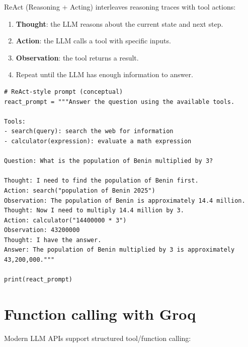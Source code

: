 ReAct (Reasoning + Acting) interleaves reasoning traces with tool actions:

\begin{enumerate}
  \item \textbf{Thought}: the LLM reasons about the current state and next step.
  \item \textbf{Action}: the LLM calls a tool with specific inputs.
  \item \textbf{Observation}: the tool returns a result.
  \item Repeat until the LLM has enough information to answer.
\end{enumerate}

\begin{verbatim}
# ReAct-style prompt (conceptual)
react_prompt = """Answer the question using the available tools.

Tools:
- search(query): search the web for information
- calculator(expression): evaluate a math expression

Question: What is the population of Benin multiplied by 3?

Thought: I need to find the population of Benin first.
Action: search("population of Benin 2025")
Observation: The population of Benin is approximately 14.4 million.
Thought: Now I need to multiply 14.4 million by 3.
Action: calculator("14400000 * 3")
Observation: 43200000
Thought: I have the answer.
Answer: The population of Benin multiplied by 3 is approximately 43,200,000."""

print(react_prompt)
\end{verbatim}

\section{Function calling with Groq}

Modern LLM APIs support structured tool/function calling:

